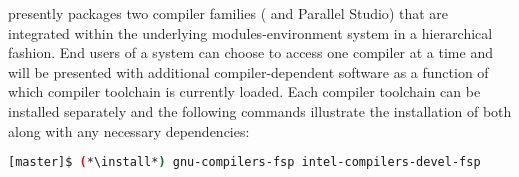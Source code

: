 \OHPC{} presently packages two compiler families ({\GNU{}} and {\Intel{}
  Parallel Studio}) that are integrated within the underlying
modules-environment system in a hierarchical fashion. End users of a \OHPC{}
system can choose to access one compiler at a time and will be presented with
additional compiler-dependent software as a function of which compiler
toolchain is currently loaded. Each compiler toolchain can be installed
separately and the following commands illustrate the installation of both along
with any necessary dependencies:

\begin{lstlisting}[language=bash]
[master]$ (*\install*) gnu-compilers-fsp intel-compilers-devel-fsp
\end{lstlisting}

